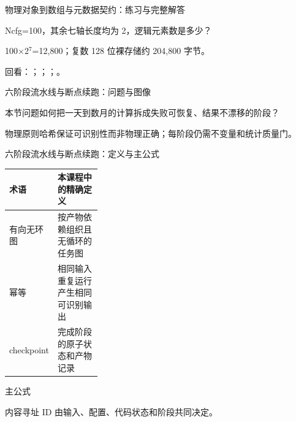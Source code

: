 \begin{frame}[t]{物理对象到数组与元数据契约：练习与完整解答}
\footnotesize
\begin{block}{}Ncfg=100，其余七轴长度均为 2，逻辑元素数是多少？\end{block}
\begin{exampleblock}{}100\ensuremath{\times}2\ensuremath{^{7}}=12,800；复数 128 位裸存储约 204,800 字节。\end{exampleblock}
\vfill
\scriptsize 回看：；；；。
\end{frame}

\begin{frame}[t]{六阶段流水线与断点续跑：问题与图像}
\footnotesize
\begin{block}{本节问题}如何把一天到数月的计算拆成失败可恢复、结果不漂移的阶段？\end{block}
\begin{block}{物理原则}\quad 哈希保证可识别性而非物理正确；每阶段仍需不变量和统计质量门。\end{block}
\end{frame}

\begin{frame}[t]{六阶段流水线与断点续跑：定义与主公式}
\footnotesize\begin{tabularx}{\linewidth}{p{0.30\linewidth}Y}
\toprule 术语 & 本课程中的精确定义\\\midrule
{} 有向无环图 & 按产物依赖组织且无循环的任务图\\
 幂等 & 相同输入重复运行产生相同可识别输出\\
 checkpoint & 完成阶段的原子状态和产物记录\\
\bottomrule\end{tabularx}\vspace{0.15cm}
\begin{block}{ 主公式}\centering{}\end{block}
内容寻址 ID 由输入、配置、代码状态和阶段共同决定。
\end{frame}

